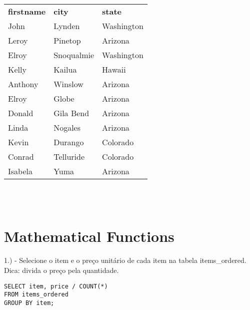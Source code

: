 \begin{tabular}{lll}
    {\textbf{firstname}} & {\textbf{city}} & {\textbf{state}} \\
    {John}               & {Lynden}        & {Washington}     \\
    {Leroy}              & {Pinetop}       & {Arizona}        \\
    {Elroy}              & {Snoqualmie}    & {Washington}     \\
    {Kelly}              & {Kailua}        & {Hawaii}         \\
    {Anthony}            & {Winslow}       & {Arizona}        \\
    {Elroy}              & {Globe}         & {Arizona}        \\
    {Donald}             & {Gila Bend}     & {Arizona}        \\
    {Linda}              & {Nogales}       & {Arizona}        \\
    {Kevin}              & {Durango}       & {Colorado}       \\
    {Conrad}             & {Telluride}     & {Colorado}       \\
    {Isabela}            & {Yuma}          & {Arizona}       
\end{tabular} \\ \\

\newpage

\section{Mathematical Functions}

1.) - Selecione o item e o preço unitário de cada item na tabela items\_ordered. Dica: divida o preço pela quantidade.

\begin{lstlisting}
SELECT item, price / COUNT(*)
FROM items_ordered
GROUP BY item;   
\end{lstlisting}

